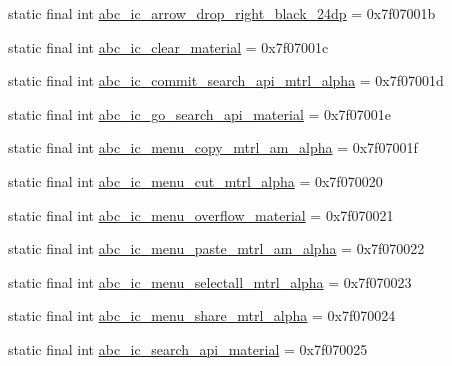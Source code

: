 \begin{DoxyCompactItemize}
\item 
static final int \mbox{\hyperlink{classandroid_1_1support_1_1design_1_1_r_1_1drawable_add406d0fcbe4ae94b5da1e3fa1965a4a}{abc\+\_\+ic\+\_\+arrow\+\_\+drop\+\_\+right\+\_\+black\+\_\+24dp}} = 0x7f07001b
\item 
static final int \mbox{\hyperlink{classandroid_1_1support_1_1design_1_1_r_1_1drawable_ae63d299171687a72cf4d3224eaa77ef6}{abc\+\_\+ic\+\_\+clear\+\_\+material}} = 0x7f07001c
\item 
static final int \mbox{\hyperlink{classandroid_1_1support_1_1design_1_1_r_1_1drawable_a6f2650927b8bc2de3aed0d6182fbdc1c}{abc\+\_\+ic\+\_\+commit\+\_\+search\+\_\+api\+\_\+mtrl\+\_\+alpha}} = 0x7f07001d
\item 
static final int \mbox{\hyperlink{classandroid_1_1support_1_1design_1_1_r_1_1drawable_ac4daff2469a8455e90a0299184bdaf0c}{abc\+\_\+ic\+\_\+go\+\_\+search\+\_\+api\+\_\+material}} = 0x7f07001e
\item 
static final int \mbox{\hyperlink{classandroid_1_1support_1_1design_1_1_r_1_1drawable_a2f5309e63474158ee7b801b97c57e75c}{abc\+\_\+ic\+\_\+menu\+\_\+copy\+\_\+mtrl\+\_\+am\+\_\+alpha}} = 0x7f07001f
\item 
static final int \mbox{\hyperlink{classandroid_1_1support_1_1design_1_1_r_1_1drawable_a57f5209b3da1abe79340d6f761c086fe}{abc\+\_\+ic\+\_\+menu\+\_\+cut\+\_\+mtrl\+\_\+alpha}} = 0x7f070020
\item 
static final int \mbox{\hyperlink{classandroid_1_1support_1_1design_1_1_r_1_1drawable_ac6c9781cb3f05911ad57d51dcb9a0720}{abc\+\_\+ic\+\_\+menu\+\_\+overflow\+\_\+material}} = 0x7f070021
\item 
static final int \mbox{\hyperlink{classandroid_1_1support_1_1design_1_1_r_1_1drawable_a4e6ea049511edc786da2401ea1af7aa6}{abc\+\_\+ic\+\_\+menu\+\_\+paste\+\_\+mtrl\+\_\+am\+\_\+alpha}} = 0x7f070022
\item 
static final int \mbox{\hyperlink{classandroid_1_1support_1_1design_1_1_r_1_1drawable_af61cd59ede2a2d0c843a247123154674}{abc\+\_\+ic\+\_\+menu\+\_\+selectall\+\_\+mtrl\+\_\+alpha}} = 0x7f070023
\item 
static final int \mbox{\hyperlink{classandroid_1_1support_1_1design_1_1_r_1_1drawable_a63c9c5f3b9f430077d1b7fb19e37b279}{abc\+\_\+ic\+\_\+menu\+\_\+share\+\_\+mtrl\+\_\+alpha}} = 0x7f070024
\item 
static final int \mbox{\hyperlink{classandroid_1_1support_1_1design_1_1_r_1_1drawable_a4a95e750125c3f61a6ae8d96137426ec}{abc\+\_\+ic\+\_\+search\+\_\+api\+\_\+material}} = 0x7f070025

\end{DoxyCompactItemize}
